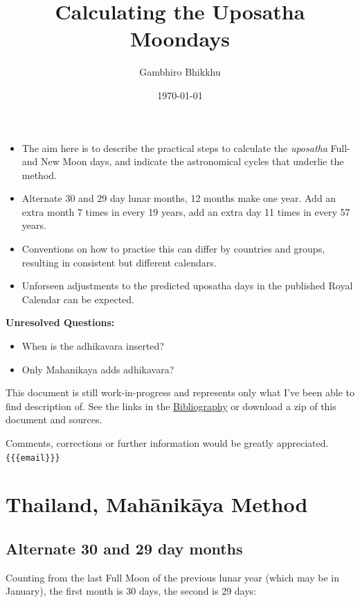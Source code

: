 \documentclass[11pt,oneside]{memoir-article}
\author{Gambhiro Bhikkhu}
\date{\today}
\title{Calculating the Uposatha Moondays}
\begin{document}
\maketitle
\begin{tldr}
\begin{itemize}
\item The aim here is to describe the practical steps to calculate the
\emph{uposatha} Full- and New Moon days, and indicate the astronomical
cycles that underlie the method.
\item Alternate 30 and 29 day lunar months, 12 months make one year. Add
an extra month 7 times in every 19 years, add an extra day 11 times
in every 57 years.
\item Conventions on how to practise this can differ by countries and
groups, resulting in consistent but different calendars.
\item Unforseen adjustments to the predicted uposatha days in the
published Royal Calendar can be expected.
\end{itemize}
\end{tldr}

\begin{center}
\textbf{Unresolved Questions:}

\begin{itemize}
\item When is the adhikavara inserted?
\item Only Mahanikaya adds adhikavara?
\end{itemize}

This document is still work-in-progress and represents only what I've
been able to find description of. See the links in the \hyperref[sec-5]{Bibliography} or
download a zip of this document and sources.

Comments, corrections or further information would be greatly
appreciated. \texttt{\{\{\{email\}\}\}}
\end{center}

\chapter{Thailand, Mahānikāya Method}
\label{sec-1}
\section{Alternate 30 and 29 day months}
\label{sec-1-1}

Counting from the last Full Moon of the previous lunar year (which may
be in January), the first month is 30 days, the second is 29 days:
\end{document}
